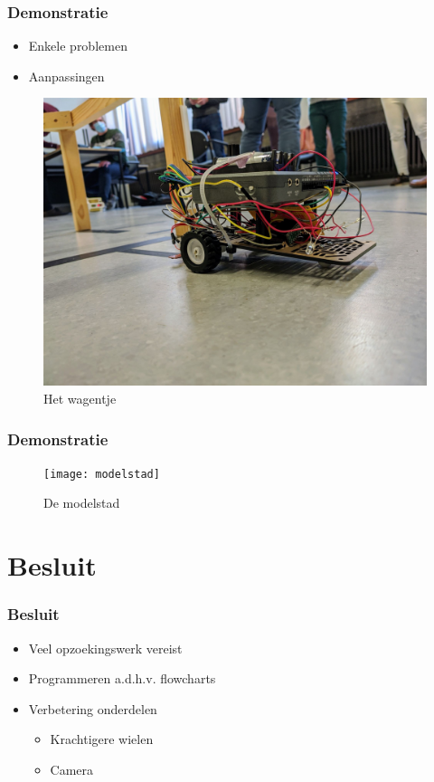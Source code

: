 \documentclass
   [kulak] %
   {kulakbeamer}
\begin{document}
\begin{frame}
	\frametitle{Demonstratie}
	\begin{itemize}
		\item Enkele problemen
		\item Aanpassingen
	\end{itemize}
	\begin{figure}
		\centering
		\includegraphics[width=.5\textwidth]{fotowagen}
		\caption{Het wagentje}
	\end{figure}
\end{frame}


\begin{frame}
	\frametitle{Demonstratie}
	\begin{figure}
		\centering
		\texttt{[image: modelstad]}
		\caption{De modelstad}
	\end{figure}
\end{frame}

\section{Besluit}
\begin{frame}
\frametitle{Besluit}
	\begin{itemize}
	\item Veel opzoekingswerk vereist
	\item Programmeren a.d.h.v. flowcharts
	\item Verbetering onderdelen
		\begin{itemize}
		\item Krachtigere wielen
		\item Camera
		\end{itemize}
\end{itemize}
\end{frame}
\end{document}

